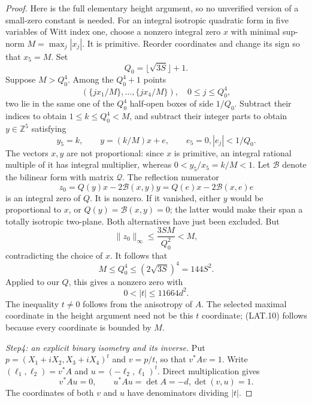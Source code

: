 \begin{proof}
Here is the full elementary height argument, so no unverified
version of a small-zero constant is needed.  For an integral
isotropic quadratic form in five variables of Witt index one,
choose a nonzero integral zero $x$ with minimal sup-norm
$M=\max_j|x_j|$.  It is primitive.  Reorder coordinates and
change its sign so that $x_5=M$.  Set
\[
                       Q_0=\lfloor\sqrt{3S}\rfloor+1.
\]
Suppose $M>Q_0^4$.  Among the $Q_0^4+1$ points
\[
 \left(\{j x_1/M\},\ldots,\{j x_4/M\}\right),
                         \quad 0\le j\le Q_0^4,
\]
two lie in the same one of the $Q_0^4$ half-open boxes of
side $1/Q_0$.  Subtract their indices to obtain
$1\le k\le Q_0^4<M$, and subtract their integer parts to
obtain $y\in\mathbb Z^5$ satisfying
\[
 y_5=k,\qquad y=(k/M)x+e,\qquad e_5=0,
                         |e_j|<1/Q_0.
\]
The vectors $x,y$ are not proportional: since $x$ is primitive,
an integral rational multiple of it has integral multiplier,
whereas $0<y_5/x_5=k/M<1$.
Let $\mathcal B$ denote the bilinear form with matrix
$\mathcal Q$.  The reflection numerator
\[
             z_0=Q(y)x-2\mathcal B(x,y)y
                 =Q(e)x-2\mathcal B(x,e)e                     \tag{LAT.9}
\]
is an integral zero of $Q$.  It is nonzero.  If it vanished,
either $y$ would be proportional to $x$, or
$Q(y)=\mathcal B(x,y)=0$; the latter would make their span
a totally isotropic two-plane.  Both alternatives have just
been excluded.  But
\[
 \|z_0\|_\infty
       \le\frac{3SM}{Q_0^2}<M,
\]
contradicting the choice of $x$.  It follows that
\[
 M\le Q_0^4\le(2\sqrt{3S})^4=144S^2.
\]
Applied to our $Q$, this gives a nonzero zero with
\[
              0<|t|\le11664d^2.                             \tag{LAT.10}
\]
The inequality $t\ne0$ follows from the anisotropy of $A$.
The selected maximal coordinate in the height argument need
not be this $t$ coordinate; (LAT.10) follows because every
coordinate is bounded by $M$.

\emph{Step4: an explicit binary isometry and its inverse.}
Put $p=(X_1+iX_2,X_3+iX_4)^t$ and $v=p/t$, so that
$v^*Av=1$.  Write $(\ell_1,\ell_2)=v^*A$ and
$u=(-\ell_2,\ell_1)^t$.  Direct multiplication gives
\[
          v^*Au=0,\qquad u^*Au=\det A=-d,
                    \det(v,u)=1.                             \tag{LAT.11}
\]
The coordinates of both $v$ and $u$ have denominators dividing
$|t|$.


\end{proof}
